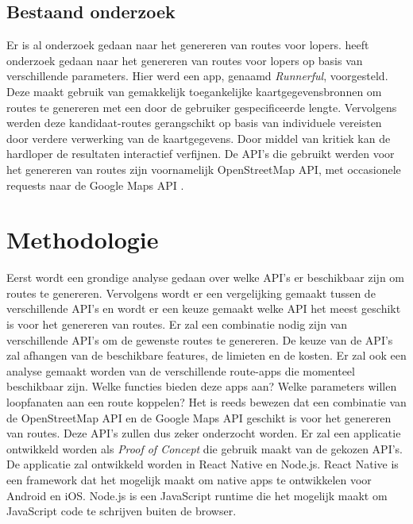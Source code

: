 \subsection{Bestaand onderzoek}
Er is al onderzoek gedaan naar het genereren van routes voor lopers. \textcite{Loepp2018} heeft onderzoek gedaan naar het genereren van routes voor lopers op basis van verschillende parameters.
Hier werd een app, genaamd \textit{Runnerful}, voorgesteld. Deze maakt gebruik van gemakkelijk toegankelijke kaartgegevensbronnen om routes te genereren met een door de gebruiker gespecificeerde lengte.
Vervolgens werden  deze kandidaat-routes gerangschikt op basis van individuele vereisten door verdere verwerking van de kaartgegevens. Door middel van kritiek kan de hardloper de resultaten interactief verfijnen.
De API's die gebruikt werden voor het genereren van routes zijn voornamelijk OpenStreetMap API, met occasionele requests naar de Google Maps API \autocite{Loepp2018}.


\section{Methodologie}%
\label{sec:methodologie}

Eerst wordt een grondige analyse gedaan over welke API's er beschikbaar zijn om routes te genereren. Vervolgens wordt er een vergelijking gemaakt tussen de verschillende API's en wordt er een keuze gemaakt welke API het meest geschikt is voor het genereren van routes. Er zal een combinatie nodig zijn van verschillende API's om de gewenste routes te genereren.
De keuze van de API's zal afhangen van de beschikbare features, de limieten en de kosten. Er zal ook een analyse gemaakt worden van de verschillende route-apps die momenteel beschikbaar zijn. Welke functies bieden deze apps aan? Welke parameters willen loopfanaten aan een route koppelen? 
Het is reeds bewezen dat een combinatie van de OpenStreetMap API en de Google Maps API geschikt is voor het genereren van routes. \autocite{Loepp2018} Deze API's zullen dus zeker onderzocht worden.
Er zal een applicatie ontwikkeld worden als \emph{Proof of Concept} die gebruik maakt van de gekozen API's. De applicatie zal ontwikkeld worden in React Native en Node.js. React Native is een framework dat het mogelijk maakt om native apps te ontwikkelen voor Android en iOS\@. Node.js is een JavaScript runtime die het mogelijk maakt om JavaScript code te schrijven buiten de browser.

